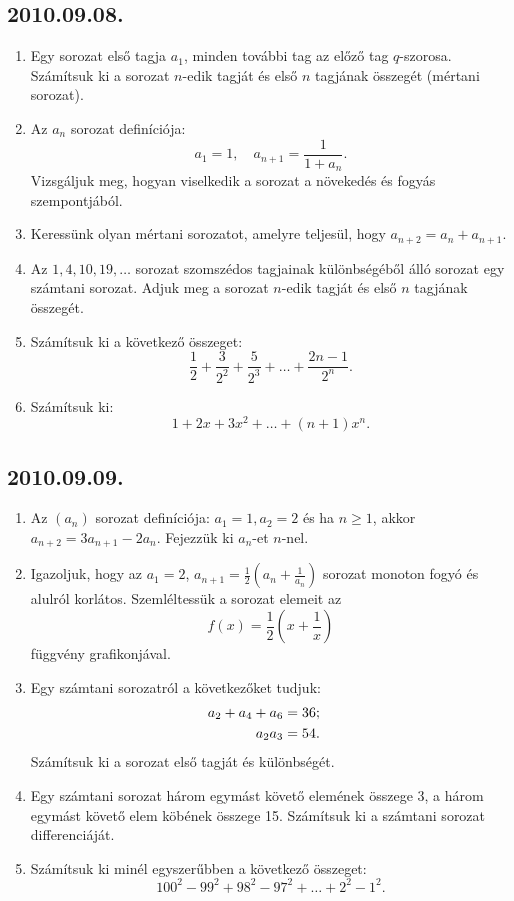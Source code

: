 \subsection*{2010.09.08.}
\begin{enumerate}
\item Egy sorozat első tagja $a_1$, minden további tag az előző tag $q$-szorosa. Számítsuk ki a sorozat $n$-edik tagját és első $n$ tagjának összegét (mértani sorozat).
\item Az $a_n$ sorozat definíciója:
$$a_1=1,\quad a_{n+1}=\frac{1}{1+a_n}.$$
Vizsgáljuk meg, hogyan viselkedik a sorozat a növekedés és fogyás szempontjából.
\item Keressünk olyan mértani sorozatot, amelyre teljesül, hogy $a_{n+2}=a_n+a_{n+1}$.
\item Az $1,4,10,19,\ldots$ sorozat szomszédos tagjainak különbségéből álló sorozat egy számtani sorozat. Adjuk meg a sorozat $n$-edik tagját és első $n$ tagjának összegét.
\item Számítsuk ki a következő összeget:
$$\frac{1}{2}+\frac{3}{2^2}+\frac{5}{2^3}+\ldots
+\frac{2n-1}{2^n}.$$
\item Számítsuk ki:
$$1+2x+3x^2+\ldots+(n+1)x^n.$$
\end{enumerate}


\subsection*{2010.09.09.}
\begin{enumerate}
\item Az $(a_n)$ sorozat definíciója: $a_1=1, a_2=2$ és ha $n\ge 1$, akkor $a_{n+2}=3a_{n+1}-2a_n$. Fejezzük ki $a_n$-et $n$-nel.
\item Igazoljuk, hogy az $a_1=2$, $a_{n+1}=\frac{1}{2}\left(a_n+\frac{1}{a_n}\right)$ sorozat monoton fogyó és alulról korlátos. Szemléltessük a sorozat elemeit az 
$$f(x)=\frac{1}{2}\left(x+\frac{1}{x}\right)$$
függvény grafikonjával.
\item Egy számtani sorozatról a következőket tudjuk:
\begin{align*}
a_2+a_4+a_6&=36;\cr
a_2a_3&=54.
\end{align*}
Számítsuk ki a sorozat első tagját és különbségét.
\item Egy számtani sorozat három egymást követő elemének összege 3, a három egymást követő elem köbének összege 15. Számítsuk ki a számtani sorozat differenciáját.
\item Számítsuk ki minél egyszerűbben a következő összeget:
$$100^2-99^2+98^2-97^2+\ldots+2^2-1^2.$$
\end{enumerate}


